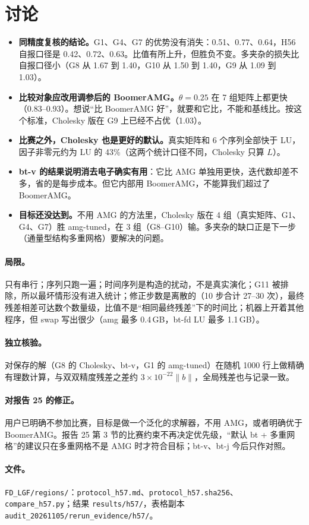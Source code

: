 \documentclass[11pt,a4paper]{ctexart}
\begin{document}
\section{讨论}
\begin{itemize}
\item \textbf{同精度复核的结论。}G1、G4、G7 的优势没有消失：0.51、0.77、0.64，H56 自报口径是 0.42、0.72、0.63。比值有所上升，但胜负不变。多夹杂的损失比自报口径小（G8 从 1.67 到 1.40，G10 从 1.50 到 1.40，G9 从 1.09 到 1.03）。
\item \textbf{比较对象应改用调参后的 BoomerAMG。}$\theta=0.25$ 在 7 组矩阵上都更快（0.83--0.93）。想说“比 BoomerAMG 好”，就要和它比，不能和基线比。按这个标准，Cholesky 版在 G9 上已经不占优（1.03）。
\item \textbf{比赛之外，Cholesky 也是更好的默认。}真实矩阵和 6 个序列全部快于 LU，因子非零元约为 LU 的 43\%（这两个统计口径不同，Cholesky 只算 $L$）。
\item \textbf{bt-v 的结果说明消去电子确实有用}：它比 AMG 单独用更快，迭代数却差不多，省的是每步成本。但它内部用 BoomerAMG，不能算我们超过了 BoomerAMG。
\item \textbf{目标还没达到。}不用 AMG 的方法里，Cholesky 版在 4 组（真实矩阵、G1、G4、G7）胜 amg-tuned，在 3 组（G8--G10）输。多夹杂的缺口正是下一步（通量型结构多重网格）要解决的问题。
\end{itemize}

\paragraph{局限。}只有串行；序列只跑一遍；时间序列是构造的扰动，不是真实演化；G11 被排除，所以最坏情形没有进入统计；修正步数是离散的（10 步合计 27--30 次），最终残差相差可达数个数量级，比值不是“相同最终残差”下的时间比；机器上开着其他程序，但 swap 写出很少（amg 最多 0.4\,GB，bt-fd LU 最多 1.1\,GB）。

\paragraph{独立核验。}对保存的解（G8 的 Cholesky、bt-v，G1 的 amg-tuned）在随机 1000 行上做精确有理数计算，与双双精度残差之差约 $3\times10^{-22}\|b\|$，全局残差也与记录一致。

\paragraph{对报告 25 的修正。}用户已明确不参加比赛，目标是做一个泛化的求解器，不用 AMG，或者明确优于 BoomerAMG。报告 25 第 3 节的比赛约束不再决定优先级，“默认 bt + 多重网格”的建议只在多重网格不是 AMG 时才符合目标；bt-v、bt-j 今后只作对照。

\paragraph{文件。}\texttt{FD\_LGF/regions/}：\texttt{protocol\_h57.md}、\texttt{protocol\_h57.sha256}、\texttt{compare\_h57.py}；结果 \texttt{results/h57/}，表格副本 \texttt{audit\_20261105/rerun\_evidence/h57/}。
\end{document}
